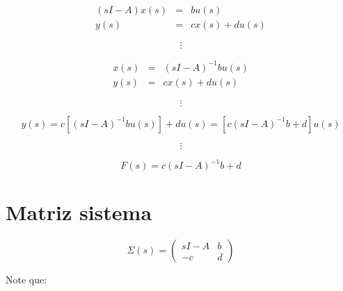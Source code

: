         \begin{eqnarray}
        (s I - A) x(s) & = & b u(s) \nonumber \\
        y(s) & = & c x(s) + d u(s) \nonumber
        \end{eqnarray}

        \begin{equation}
            \vdots \nonumber
        \end{equation}

        \begin{eqnarray}
        x(s) & = & (s I - A)^{-1} b u(s) \nonumber \\
        y(s) & = & c x(s) + d u(s) \nonumber
        \end{eqnarray}

        \begin{equation}
            \vdots \nonumber
        \end{equation}

        \begin{equation}
            y(s) = c[(s I - A)^{-1} b u(s)] + d u(s) = [c(s I - A)^{-1} b + d] u(s) \nonumber
        \end{equation}

        \begin{equation}
            \vdots \nonumber
        \end{equation}

        \begin{equation}
            F(s) = c(s I - A)^{-1} b + d
        \end{equation}

    \section{Matriz sistema}

        \begin{equation}
            \Sigma(s) =
            \begin{pmatrix}
            sI - A & b \\
            -c & d
            \end{pmatrix}
        \end{equation}

        Note que:

